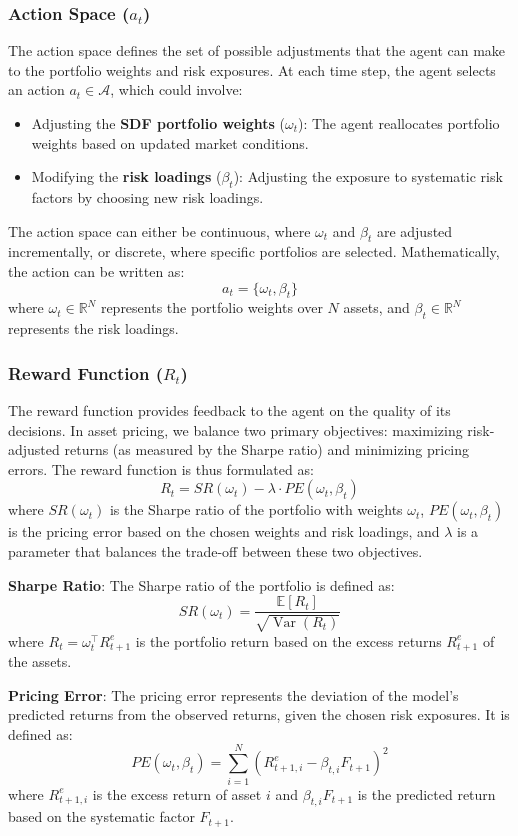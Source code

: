 \subsubsection{Action Space ($a_t$)}

The action space defines the set of possible adjustments that the agent can make to the portfolio weights and risk exposures. At each time step, the agent selects an action $a_t \in \mathcal{A}$, which could involve:
\begin{itemize}
    \item Adjusting the \textbf{SDF portfolio weights} ($\omega_t$): The agent reallocates portfolio weights based on updated market conditions.
    \item Modifying the \textbf{risk loadings} ($\beta_t$): Adjusting the exposure to systematic risk factors by choosing new risk loadings.
\end{itemize}

The action space can either be continuous, where $\omega_t$ and $\beta_t$ are adjusted incrementally, or discrete, where specific portfolios are selected. Mathematically, the action can be written as:
\[
a_t = \{ \omega_t, \beta_t \}
\]
where $\omega_t \in \mathbb{R}^N$ represents the portfolio weights over $N$ assets, and $\beta_t \in \mathbb{R}^N$ represents the risk loadings.

\subsubsection{Reward Function ($R_t$)}

The reward function provides feedback to the agent on the quality of its decisions. In asset pricing, we balance two primary objectives: maximizing risk-adjusted returns (as measured by the Sharpe ratio) and minimizing pricing errors. The reward function is thus formulated as:
\[
R_t = SR(\omega_t) - \lambda \cdot PE(\omega_t, \beta_t)
\]
where $SR(\omega_t)$ is the Sharpe ratio of the portfolio with weights $\omega_t$, $PE(\omega_t, \beta_t)$ is the pricing error based on the chosen weights and risk loadings, and $\lambda$ is a parameter that balances the trade-off between these two objectives.

\textbf{Sharpe Ratio}:
The Sharpe ratio of the portfolio is defined as:
\[
SR(\omega_t) = \frac{\mathbb{E}[R_t]}{\sqrt{\operatorname{Var}(R_t)}}
\]
where $R_t = \omega_t^\top R_{t+1}^e$ is the portfolio return based on the excess returns $R_{t+1}^e$ of the assets.

\textbf{Pricing Error}:
The pricing error represents the deviation of the model's predicted returns from the observed returns, given the chosen risk exposures. It is defined as:
\[
PE(\omega_t, \beta_t) = \sum_{i=1}^N \left( R_{t+1, i}^e - \beta_{t, i} F_{t+1} \right)^2
\]
where $R_{t+1, i}^e$ is the excess return of asset $i$ and $\beta_{t, i} F_{t+1}$ is the predicted return based on the systematic factor $F_{t+1}$.

